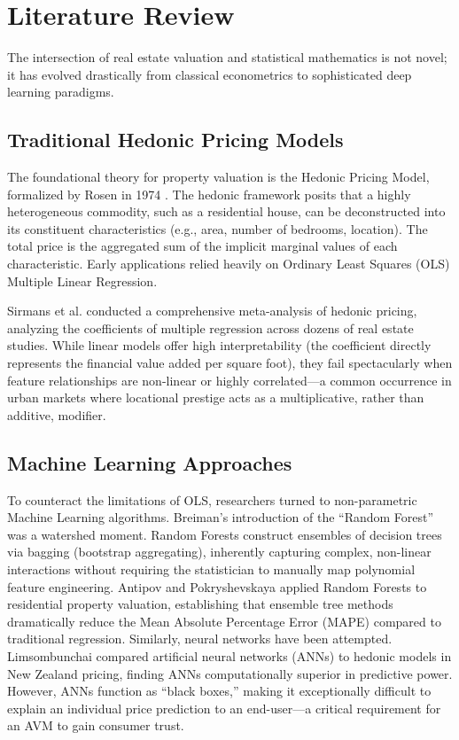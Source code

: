 \documentclass[conference]{IEEEtran}
\begin{document}
\section{Literature Review}

The intersection of real estate valuation and statistical mathematics is not novel; it has evolved drastically from classical econometrics to sophisticated deep learning paradigms.

\subsection{Traditional Hedonic Pricing Models}
The foundational theory for property valuation is the Hedonic Pricing Model, formalized by Rosen in 1974 \cite{rosen}. The hedonic framework posits that a highly heterogeneous commodity, such as a residential house, can be deconstructed into its constituent characteristics (e.g., area, number of bedrooms, location). The total price is the aggregated sum of the implicit marginal values of each characteristic. Early applications relied heavily on Ordinary Least Squares (OLS) Multiple Linear Regression. 

Sirmans et al. \cite{sirmans} conducted a comprehensive meta-analysis of hedonic pricing, analyzing the coefficients of multiple regression across dozens of real estate studies. While linear models offer high interpretability (the coefficient directly represents the financial value added per square foot), they fail spectacularly when feature relationships are non-linear or highly correlated—a common occurrence in urban markets where locational prestige acts as a multiplicative, rather than additive, modifier.

\subsection{Machine Learning Approaches}
To counteract the limitations of OLS, researchers turned to non-parametric Machine Learning algorithms. Breiman’s introduction of the ``Random Forest'' \cite{breiman} was a watershed moment. Random Forests construct ensembles of decision trees via bagging (bootstrap aggregating), inherently capturing complex, non-linear interactions without requiring the statistician to manually map polynomial feature engineering.
Antipov and Pokryshevskaya \cite{antipov} applied Random Forests to residential property valuation, establishing that ensemble tree methods dramatically reduce the Mean Absolute Percentage Error (MAPE) compared to traditional regression. Similarly, neural networks have been attempted. Limsombunchai \cite{limso} compared artificial neural networks (ANNs) to hedonic models in New Zealand pricing, finding ANNs computationally superior in predictive power. However, ANNs function as ``black boxes,'' making it exceptionally difficult to explain an individual price prediction to an end-user—a critical requirement for an AVM to gain consumer trust.
\end{document}
